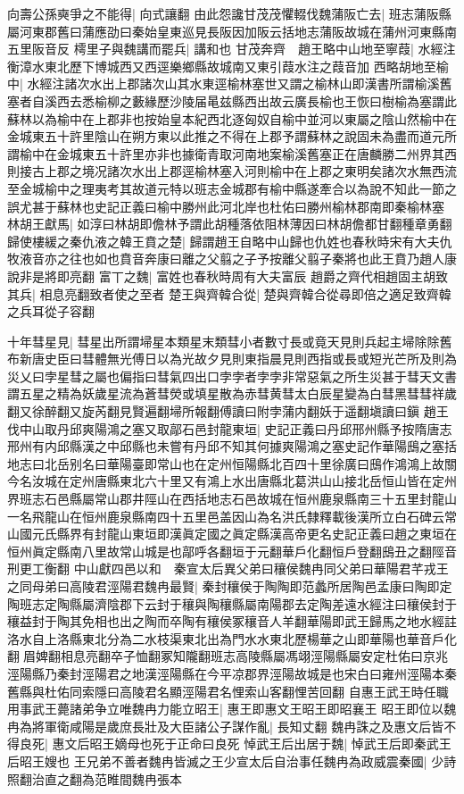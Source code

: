 向壽公孫奭爭之不能得|{
	向式讓翻}
由此怨讒甘茂茂懼輟伐魏蒲阪亡去|{
	班志蒲阪縣屬河東郡舊曰蒲應劭曰秦始皇東巡見長阪因加阪云括地志蒲阪故城在蒲州河東縣南五里阪音反}
樗里子與魏講而罷兵|{
	講和也}
甘茂奔齊　趙王略中山地至寧葭|{
	水經注衡漳水東北歷下博城西又西逕樂鄉縣故城南又東引葭水注之葭音加}
西略胡地至榆中|{
	水經注諸次水出上郡諸次山其水東逕榆林塞世又謂之榆林山即漢書所謂榆溪舊塞者自溪西去悉榆柳之藪緣歷沙陵届㫣兹縣西出故云廣長榆也王恢曰樹榆為塞謂此蘇林以為榆中在上郡非也按始皇本紀西北逐匈奴自榆中並河以東屬之陰山然榆中在金城東五十許里陰山在朔方東以此推之不得在上郡予謂蘇林之說固未為盡而道元所謂榆中在金城東五十許里亦非也據衛青取河南地案榆溪舊塞正在唐麟勝二州界其西則接古上郡之境况諸次水出上郡逕榆林塞入河則榆中在上郡之東明矣諸次水無西流至金城榆中之理夷考其故道元特以班志金城郡有榆中縣遂牽合以為說不知此一節之誤尤甚于蘇林也史記正義曰榆中勝州此河北岸也杜佑曰勝州榆林郡南即秦榆林塞}
林胡王獻馬|{
	如淳曰林胡即儋林予謂此胡種落依阻林薄因曰林胡儋都甘翻種章勇翻}
歸使樓緩之秦仇液之韓王賁之楚|{
	歸謂趙王自略中山歸也仇姓也春秋時宋有大夫仇牧液音亦之往也如也賁音奔康曰離之父翦之子予按離父翦子秦將也此王賁乃趙人康說非是將即亮翻}
富丅之魏|{
	富姓也春秋時周有大夫富辰}
趙爵之齊代相趙固主胡致其兵|{
	相息亮翻致者使之至者}
楚王與齊韓合從|{
	楚與齊韓合從尋即倍之適足致齊韓之兵耳從子容翻}


十年彗星見|{
	彗星出所謂埽星本類星末類彗小者數寸長或竟天見則兵起主埽除除舊布新唐史臣曰彗體無光傅日以為光故夕見則東指晨見則西指或長或短光芒所及則為災乂曰孛星彗之屬也偏指曰彗氣四出口孛孛者孛孛非常惡氣之所生災甚于彗天文書謂五星之精為妖歲星流為蒼彗熒或填星散為赤彗黄彗太白辰星變為白彗黑彗彗祥歲翻又徐醉翻又旋芮翻見賢遍翻埽所報翻傅讀曰附孛蒲内翻妖于遥翻塡讀曰鎭}
趙王伐中山取丹邱爽陽鴻之塞又取鄗石邑封龍東垣|{
	史記正義曰丹邱邢州縣予按隋唐志邢州有内邱縣漢之中邱縣也未嘗有丹邱不知其何據爽陽鴻之塞史記作華陽䲭之塞括地志曰北岳别名曰華陽臺即常山也在定州恒陽縣北百四十里徐廣曰䲭作鴻鴻上故關今名汝城在定州唐縣東北六十里又有鴻上水出唐縣北葛洪山山接北岳恒山皆在定州界班志石邑縣屬常山郡井陘山在西括地志石邑故城在恒州鹿泉縣南三十五里封龍山一名飛龍山在恒州鹿泉縣南四十五里邑盖因山為名洪氏隸釋載後漢所立白石碑云常山國元氏縣界有封龍山東垣即漢眞定國之眞定縣漢高帝更名史記正義曰趙之東垣在恒州眞定縣南八里故常山城是也鄗呼各翻垣于元翻華戶化翻恒戶登翻䲭丑之翻陘音刑更工衡翻}
中山獻四邑以和　秦宣太后異父弟曰穰侯魏冉同父弟曰華陽君芊戎王之同母弟曰高陵君涇陽君魏冉最賢|{
	秦封穰侯于陶陶即范蠡所居陶邑孟康曰陶即定陶班志定陶縣屬濟陰郡下云封于穰與陶穰縣屬南陽郡去定陶差遠水經注曰穰侯封于穰益封于陶其免相也出之陶而卒陶有穰侯冢穰音人羊翻華陽即武王歸馬之地水經註洛水自上洛縣東北分為二水枝渠東北出為門水水東北歷楊華之山即華陽也華音戶化翻眉婢翻相息亮翻卒子恤翻冢知隴翻班志高陵縣屬馮翊涇陽縣屬安定杜佑曰京兆涇陽縣乃秦封涇陽君之地漢涇陽縣在今平凉郡界涇陽故城是也宋白曰雍州涇陽本秦舊縣與杜佑同索隱曰高陵君名顯涇陽君名悝索山客翻悝苦回翻}
自惠王武王時任職用事武王薨諸弟争立唯魏冉力能立昭王|{
	惠王即惠文王昭王即昭襄王}
昭王即位以魏冉為將軍衛咸陽是歲庶長壯及大臣諸公子謀作亂|{
	長知丈翻}
魏冉誅之及惠文后皆不得良死|{
	惠文后昭王嫡母也死于正命曰良死}
悼武王后出居于魏|{
	悼武王后即秦武王后昭王嫂也}
王兄弟不善者魏冉皆滅之王少宣太后自治事任魏冉為政威震秦國|{
	少詩照翻治直之翻為范睢間魏冉張本}


